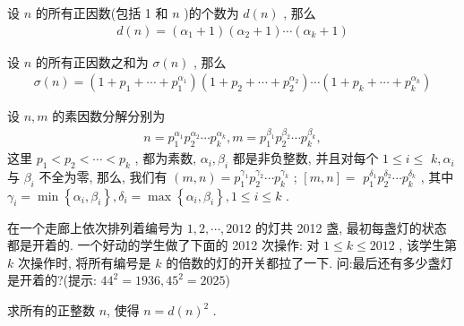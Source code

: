 \documentclass[aspectratio=169]{ctexbeamer}
\theoremstyle{definition}
\begin{document}
\begin{frame}
	\begin{corollary}
		设 $n$ 的所有正因数(包括 1 和 $n$ )的个数为 $d(n)$ , 那么
		\begin{align*}
			d(n)=\left(\alpha_{1}+1\right)\left(\alpha_{2}+1\right) \cdots\left(\alpha_{k}+1\right)
		\end{align*}
	\end{corollary}
	\begin{corollary}
		设 $n$ 的所有正因数之和为 $\sigma(n)$ , 那么
		\begin{align*}
			\sigma(n)=\left(1+p_{1}+\cdots+p_{1}^{\alpha_{1}}\right)\left(1+p_{2}+\cdots+p_{2}^{\alpha_{2}}\right) \cdots\left(1+p_{k}+\cdots+p_{k}^{\alpha_{k}}\right)
		\end{align*}
	\end{corollary}
\end{frame}
\begin{frame}
	\begin{corollary}
		设 $n ,  m$ 的素因数分解分别为
		\begin{align*}
			n=p_{1}^{\alpha_{1}} p_{2}^{\alpha_{2}} \cdots p_{k}^{\alpha_{k}}, m=p_{1}^{\beta_{1}} p_{2}^{\beta_{2}} \cdots p_{k}^{\beta_{k}},
		\end{align*}
		这里 $p_{1}<p_{2}<\cdots<p_{k}$ , 都为素数,  $\alpha_{i} ,  \beta_{i}$ 都是非负整数, 并且对每个 $1 \leqslant i \leqslant$ $k, \alpha_{i}$ 与 $\beta_{i}$ 不全为零, 那么, 我们有 $(m, n)=p_{1}^{\gamma_{1}} p_{2}^{\gamma_{2}} \cdots p_{k}^{\gamma_{k}}$ ;  $[m, n]=$ $p_{1}^{\delta_{1}} p_{2}^{\delta_{2}} \cdots p_{k}^{\delta_{k}}$ , 其中 $\gamma_{i}=\min \left\{\alpha_{i}, \beta_{i}\right\}, \delta_{i}=\max \left\{\alpha_{i}, \beta_{i}\right\}, 1 \leqslant i \leqslant k$ .
	\end{corollary}
\end{frame}

\setcounter{theorem}{16}
\begin{frame}[t]
	\begin{example}
		在一个走廊上依次排列着编号为 $1,2, \cdots, 2012$ 的灯共 2012 盏, 最初每盏灯的状态都是开着的. 一个好动的学生做了下面的 2012 次操作: 对 $1 \leqslant k \leqslant 2012$ , 该学生第 $k$ 次操作时, 将所有编号是 $k$ 的倍数的灯的开关都拉了一下. 问:最后还有多少盏灯是开着的?(提示: $44^2=1936, 45^2=2025$)
	\end{example}
\end{frame}

\begin{frame}[t]
	\begin{example}
		求所有的正整数 $n$, 使得 $n=d(n)^{2}$ .
	\end{example}
\end{frame}
\end{document}

